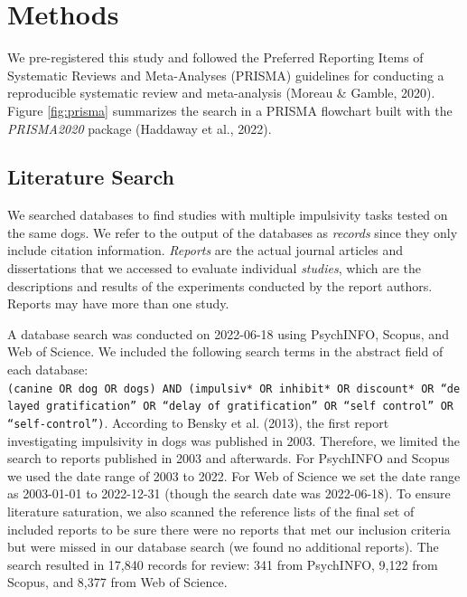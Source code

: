 \documentclass[
  ,pub,floatsintext]{apa6}
\begin{document}
\hypertarget{methods}{%
\section{Methods}\label{methods}}

We pre-registered this study and followed the Preferred Reporting Items of Systematic Reviews and Meta-Analyses (PRISMA) guidelines for conducting a reproducible systematic review and meta-analysis (Moreau \& Gamble, 2020). Figure \ref{fig:prisma} summarizes the search in a PRISMA flowchart built with the \emph{PRISMA2020} package (Haddaway et al., 2022).

\hypertarget{literature-search}{%
\subsection{Literature Search}\label{literature-search}}

We searched databases to find studies with multiple impulsivity tasks tested on the same dogs. We refer to the output of the databases as \emph{records} since they only include citation information. \emph{Reports} are the actual journal articles and dissertations that we accessed to evaluate individual \emph{studies}, which are the descriptions and results of the experiments conducted by the report authors. Reports may have more than one study.

A database search was conducted on 2022-06-18 using PsychINFO, Scopus, and Web of Science. We included the following search terms in the abstract field of each database: \texttt{(canine\ OR\ dog\ OR\ dogs)\ AND\ (impulsiv*\ OR\ inhibit*\ OR\ discount*\ OR\ “delayed\ gratification”\ OR\ “delay\ of\ gratification”\ OR\ “self\ control”\ OR\ “self-control”)}. According to Bensky et al. (2013), the first report investigating impulsivity in dogs was published in 2003. Therefore, we limited the search to reports published in 2003 and afterwards. For PsychINFO and Scopus we used the date range of 2003 to 2022. For Web of Science we set the date range as 2003-01-01 to 2022-12-31 (though the search date was 2022-06-18). To ensure literature saturation, we also scanned the reference lists of the final set of included reports to be sure there were no reports that met our inclusion criteria but were missed in our database search (we found no additional reports). The search resulted in 17,840 records for review: 341 from PsychINFO, 9,122 from Scopus, and 8,377 from Web of Science.
\end{document}
